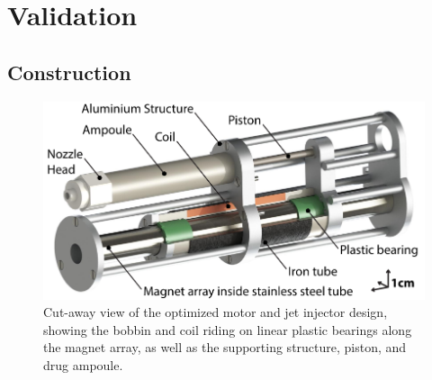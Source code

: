 \section{Validation}                                \label{Chapter:experiment/validation}


        \subsection{Construction}                   \label{Chapter:construction}
        
        
            \begin{figure}[h]
                \centering
                \includegraphics[width=5in]{chap5/images/PMLSM_render.pdf}
                \caption{Cut-away view of the optimized motor and jet injector design, showing the bobbin and coil riding on linear plastic bearings along the magnet array, as well as the supporting structure, piston, and drug ampoule.}
                \label{fig:chap/experiment/PMLSM render}
            \end{figure}
                
